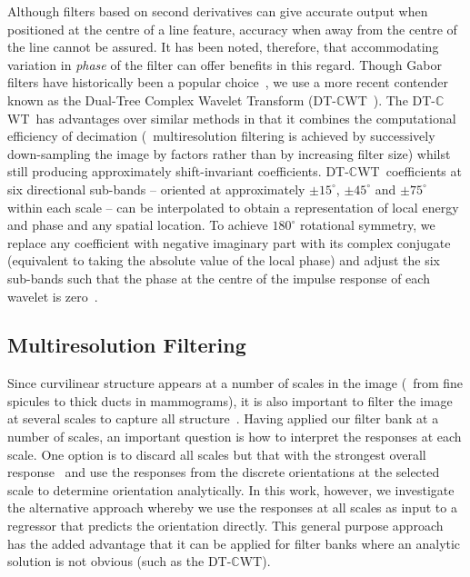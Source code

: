 \documentclass[10pt,twocolumn,letterpaper]{article}
\def\dtcwt{DT-$\mathbb{C}$WT}
\newcommand{\comment}[1]{}
\begin{document}
Although filters based on second derivatives can give accurate output when positioned at the centre of a line feature, accuracy when away from the centre of the line cannot be assured. It has been noted, therefore, that accommodating variation in \emph{phase} of the filter can offer benefits in this regard. Though Gabor filters have historically been a popular choice~\cite{Daugman_TASSP88}, we use a more recent contender known as the Dual-Tree Complex Wavelet Transform (\dtcwt~\cite{Kingsbury_PTRSLA99}). The \dtcwt~has advantages over similar methods in that it combines the computational efficiency of decimation (\ie~multiresolution filtering is achieved by successively down-sampling the image by factors rather than by increasing filter size) whilst still producing approximately shift-invariant coefficients. \dtcwt~coefficients at six directional sub-bands -- oriented at approximately $\pm15^\circ$, $\pm45^\circ$ and $\pm75^\circ$ within each scale -- can be interpolated to obtain a representation of local energy and phase and any spatial location. To achieve $180^\circ$ rotational symmetry, we replace any coefficient with negative imaginary part with its complex conjugate (equivalent to taking the absolute value of the local phase) and adjust the six sub-bands such that the phase at the centre of the impulse response of each wavelet is zero~\cite{Kingsbury_ECSP06,Berks_etal_IPMI11}.

\comment{When dealing with a complex response, $c$, we separate its magnitude, $|c|$, from its phase, $\angle c$. Since orientation is only defined up to a rotation of $180^\circ$, however, a point with phase $\phi$ displaced by $d$ from the centre of a line is indistinguishable from a point with phase $-\phi$ displaced by $-d$ from the same line when looking in the opposite direction; we therefore take the absolute value of phase, $|\angle c|$, at each pixel.}


\subsection{Multiresolution Filtering}
Since curvilinear structure appears at a number of scales in the image (\eg~from fine spicules to thick ducts in mammograms), it is also important to filter the image at several scales to capture all structure~\cite{Lindeberg_IJCV98b}. Having applied our filter bank at a number of scales, an important question is how to interpret the responses at each scale. One option is to discard all scales but that with the strongest overall response~\cite{Karssemeijer_teBrake_TMI96} and use the responses from the discrete orientations at the selected scale to determine orientation analytically. In this work, however, we investigate the alternative approach whereby we use the responses at all scales as input to a regressor that predicts the orientation directly. This general purpose approach has the added advantage that it can be applied for filter banks where an analytic solution is not obvious (such as the \dtcwt).
\end{document}
